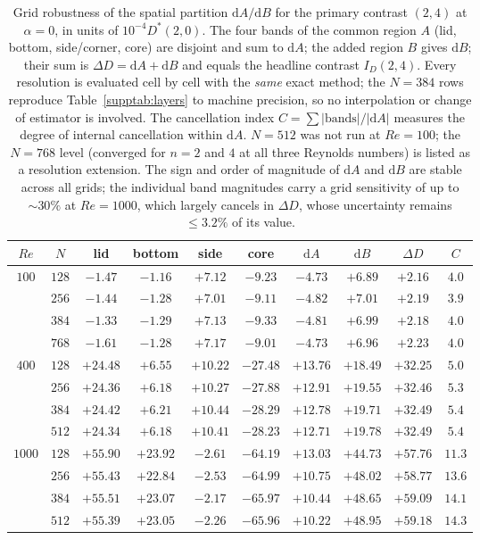 \begin{table}[!htbp]
\centering
\caption{Grid robustness of the spatial partition $\mathrm{d}A/\mathrm{d}B$ for the primary contrast $(2,4)$ at $\alpha=0$, in units of $10^{-4}D^*(2,0)$. The four bands of the common region $A$ (lid, bottom, side/corner, core) are disjoint and sum to $\mathrm{d}A$; the added region $B$ gives $\mathrm{d}B$; their sum is $\Delta D = \mathrm{d}A + \mathrm{d}B$ and equals the headline contrast $I_D(2,4)$. Every resolution is evaluated cell by cell with the \emph{same} exact method; the $N=384$ rows reproduce Table~\ref{supptab:layers} to machine precision, so no interpolation or change of estimator is involved. The cancellation index $C=\sum|\text{bands}|/|\mathrm{d}A|$ measures the degree of internal cancellation within $\mathrm{d}A$. $N=512$ was not run at $Re=100$; the $N=768$ level (converged for $n=2$ and $4$ at all three Reynolds numbers) is listed as a resolution extension. The sign and order of magnitude of $\mathrm{d}A$ and $\mathrm{d}B$ are stable across all grids; the individual band magnitudes carry a grid sensitivity of up to $\sim 30\%$ at $Re=1000$, which largely cancels in $\Delta D$, whose uncertainty remains $\leq3.2\%$ of its value.}
\label{supptab:dadb_multires}
\footnotesize
\begin{tabular}{@{}cc|cccc|cccc@{}}
\hline
$Re$ & $N$ & lid & bottom & side & core & $\mathrm{d}A$ & $\mathrm{d}B$ & $\Delta D$ & $C$ \\
\hline
$100$  & $128$ & $-1.47$ & $-1.16$ & $+7.12$ & $-9.23$ & $-4.73$  & $+6.89$  & $+2.16$  & $4.0$ \\
       & $256$ & $-1.44$ & $-1.28$ & $+7.01$ & $-9.11$ & $-4.82$ & $+7.01$ & $+2.19$ & $3.9$ \\
       & $384$ & $-1.33$ & $-1.29$ & $+7.13$ & $-9.33$ & $-4.81$ & $+6.99$ & $+2.18$ & $4.0$ \\
       & $768$ & $-1.61$ & $-1.28$ & $+7.17$ & $-9.01$ & $-4.73$ & $+6.96$ & $+2.23$ & $4.0$ \\
\hline
$400$  & $128$ & $+24.48$ & $+6.55$ & $+10.22$ & $-27.48$ & $+13.76$ & $+18.49$ & $+32.25$ & $5.0$ \\
       & $256$ & $+24.36$ & $+6.18$ & $+10.27$ & $-27.88$ & $+12.91$ & $+19.55$ & $+32.46$ & $5.3$ \\
       & $384$ & $+24.42$ & $+6.21$ & $+10.44$ & $-28.29$ & $+12.78$ & $+19.71$ & $+32.49$ & $5.4$ \\
       & $512$ & $+24.34$ & $+6.18$ & $+10.41$ & $-28.23$ & $+12.71$ & $+19.78$ & $+32.49$ & $5.4$ \\
\hline
$1000$ & $128$ & $+55.90$ & $+23.92$ & $-2.61$ & $-64.19$ & $+13.03$ & $+44.73$ & $+57.76$ & $11.3$ \\
       & $256$ & $+55.43$ & $+22.84$ & $-2.53$ & $-64.99$ & $+10.75$ & $+48.02$ & $+58.77$ & $13.6$ \\
       & $384$ & $+55.51$ & $+23.07$ & $-2.17$ & $-65.97$ & $+10.44$ & $+48.65$ & $+59.09$ & $14.1$ \\
       & $512$ & $+55.39$ & $+23.05$ & $-2.26$ & $-65.96$ & $+10.22$ & $+48.95$ & $+59.18$ & $14.3$ \\
\hline
\end{tabular}
\end{table}

